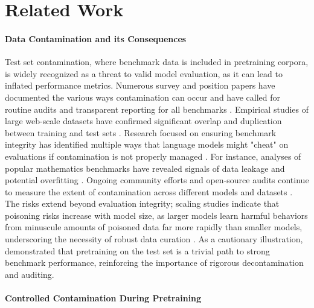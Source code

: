 \section{Related Work}
\label{app:sec:related_work}

\paragraph{Data Contamination and its Consequences}
Test set contamination, where benchmark data is included in pretraining corpora, is widely recognized as a threat to valid model evaluation, as it can lead to inflated performance metrics. Numerous survey and position papers have documented the various ways contamination can occur and have called for routine audits and transparent reporting for all benchmarks \citep{sainz2023nlp, sainz2024data, deng2024unveiling, xu2024benchmarkdatacontaminationlarge, reuel2025open}. Empirical studies of large web-scale datasets have confirmed significant overlap and duplication between training and test sets \citep{dodge2021documenting}. Research focused on ensuring benchmark integrity has identified multiple ways that language models might "cheat" on evaluations if contamination is not properly managed \citep{zhou2023dontmakellmevaluation, dong2024generalizationormemorization}. For instance, analyses of popular mathematics benchmarks have revealed signals of data leakage and potential overfitting \citep{zhang2024carefulexaminationlargelanguage}. Ongoing community efforts and open-source audits continue to measure the extent of contamination across different models and datasets \citep{li2024opensource}. The risks extend beyond evaluation integrity; scaling studies indicate that poisoning risks increase with model size, as larger models learn harmful behaviors from minuscule amounts of poisoned data far more rapidly than smaller models, underscoring the necessity of robust data curation \citep{bowen2025scalingtrendsdatapoisoning}. As a cautionary illustration, \citet{schaeffer2023pretrainingtestsetneed} demonstrated that pretraining on the test set is a trivial path to strong benchmark performance, reinforcing the importance of rigorous decontamination and auditing.

\paragraph{Controlled Contamination During Pretraining}

